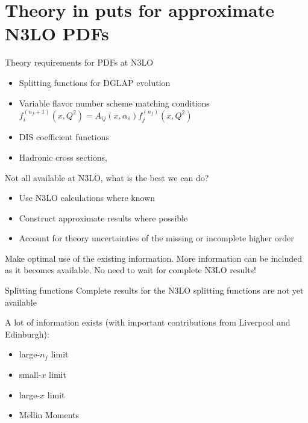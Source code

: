 \documentclass[aspectratio=169, 9pt,t]{beamer}
\begin{document}
\section{Theory in puts for approximate N3LO PDFs}

\begin{frame}{Theory requirements for PDFs at N3LO}
  \begin{itemize}
    \item Splitting functions for DGLAP evolution \\

    \item Variable flavor number scheme matching conditions \\
    $ f_i^{\left(n_f+1\right)}\left(x, Q^2\right)=A_{i j}\left(x, \alpha_s\right) f_j^{\left(n_f\right)}\left(x, Q^2\right) $
    \item DIS coefficient functions
    \item Hadronic cross sections,
  \end{itemize}

  Not all available at N3LO, what is the best we can do?
  \begin{itemize}
    \item Use N3LO calculations where known
    \item Construct approximate results where possible
    \item Account for theory uncertainties of the missing or incomplete higher order
  \end{itemize}

  Make optimal use of the existing information. More information can be included as it becomes available. No need to wait for complete N3LO results!
\end{frame}


\begin{frame}{Splitting functions}
  Complete results for the N3LO splitting functions are not yet available

  A lot of information exists (with important contributions from Liverpool and Edinburgh):
  \begin{itemize}
    \item large-$n_f$ limit
    \item small-$x$ limit
    \item large-$x$ limit
    \item Mellin Moments
  \end{itemize}
\end{frame}
\end{document}
